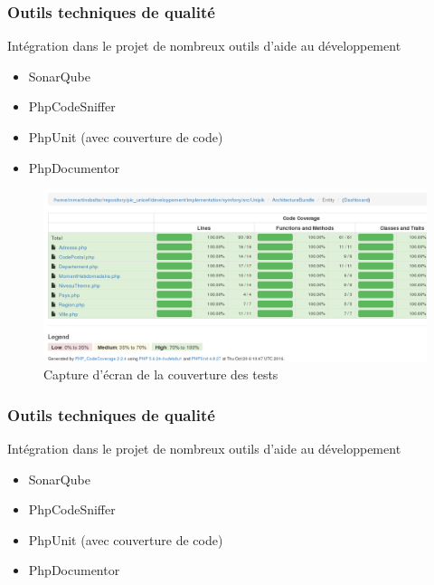 \speaker{\Matthieu}

\begin{frame}
\frametitle{Outils techniques de qualité}
\begin{block}{Intégration dans le projet de nombreux outils d'aide au développement}
	\begin{itemize}
		\item SonarQube
		\item PhpCodeSniffer
		\item PhpUnit (avec couverture de code)
		\item PhpDocumentor
	\end{itemize}
\end{block}
\end{frame}

\begin{frame}
      \begin{figure}[r]
		\includegraphics[scale=0.25]{images/coverage.png}
		\caption{Capture d'écran de la couverture des tests}
	  \end{figure}
\end{frame}

\begin{frame}
\frametitle{Outils techniques de qualité}
\begin{block}{Intégration dans le projet de nombreux outils d'aide au développement}
	\begin{itemize}
		\item SonarQube
		\item PhpCodeSniffer
		\item PhpUnit (avec couverture de code)
		\item PhpDocumentor
	\end{itemize}
\end{block}
\end{frame}


